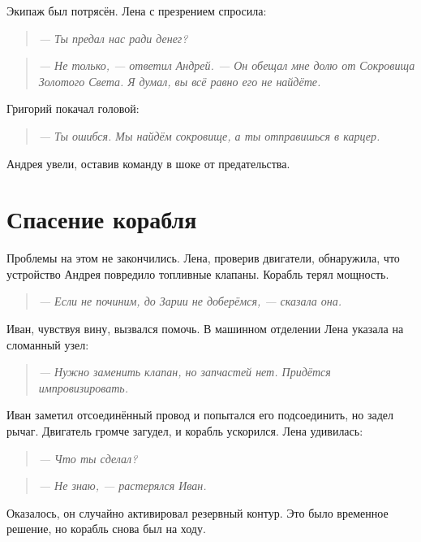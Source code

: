 \documentclass[12pt,a4paper]{book} %
\newenvironment{dialogue}{\begin{quote}\itshape}{\end{quote}}
\begin{document}
Экипаж был потрясён. Лена с презрением спросила:

\begin{dialogue}
--- Ты предал нас ради денег?
\end{dialogue}

\begin{dialogue}
--- Не только, --- ответил Андрей. --- Он обещал мне долю от Сокровища Золотого Света. Я думал, вы всё равно его не найдёте.
\end{dialogue}

Григорий покачал головой:

\begin{dialogue}
--- Ты ошибся. Мы найдём сокровище, а ты отправишься в карцер.
\end{dialogue}

Андрея увели, оставив команду в шоке от предательства.

\section*{Спасение корабля}

Проблемы на этом не закончились. Лена, проверив двигатели, обнаружила, что устройство Андрея повредило топливные клапаны. Корабль терял мощность.

\begin{dialogue}
--- Если не починим, до Зарии не доберёмся, --- сказала она.
\end{dialogue}

Иван, чувствуя вину, вызвался помочь. В машинном отделении Лена указала на сломанный узел:

\begin{dialogue}
--- Нужно заменить клапан, но запчастей нет. Придётся импровизировать.
\end{dialogue}

Иван заметил отсоединённый провод и попытался его подсоединить, но задел рычаг. Двигатель громче загудел, и корабль ускорился. Лена удивилась:

\begin{dialogue}
--- Что ты сделал?
\end{dialogue}

\begin{dialogue}
--- Не знаю, --- растерялся Иван.
\end{dialogue}

Оказалось, он случайно активировал резервный контур. Это было временное решение, но корабль снова был на ходу.
\end{document}
